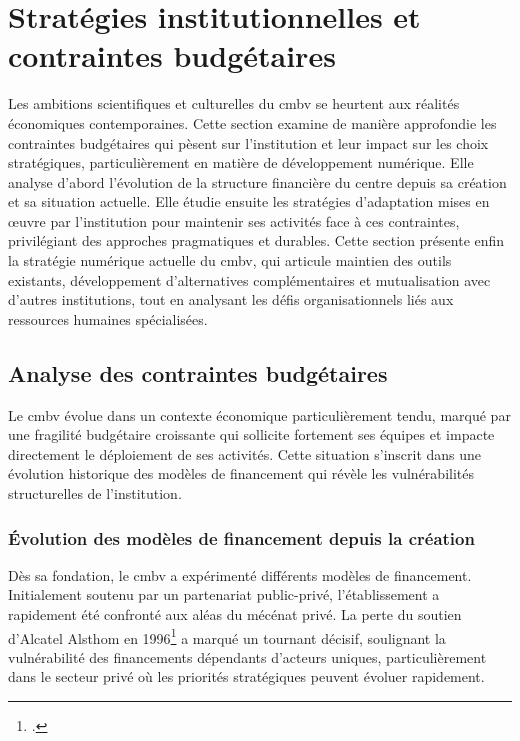 \section{Stratégies institutionnelles et contraintes budgétaires}

Les ambitions scientifiques et culturelles du \gls{cmbv} se heurtent aux réalités économiques contemporaines. Cette section examine de manière approfondie les contraintes budgétaires qui pèsent sur l'institution et leur impact sur les choix stratégiques, particulièrement en matière de développement numérique. Elle analyse d'abord l'évolution de la structure financière du centre depuis sa création et sa situation actuelle. Elle étudie ensuite les stratégies d'adaptation mises en œuvre par l'institution pour maintenir ses activités face à ces contraintes, privilégiant des approches pragmatiques et durables. Cette section présente enfin la stratégie numérique actuelle du \gls{cmbv}, qui articule maintien des outils existants, développement d'alternatives complémentaires et mutualisation avec d'autres institutions, tout en analysant les défis organisationnels liés aux ressources humaines spécialisées.

\subsection{Analyse des contraintes budgétaires}

Le \gls{cmbv} évolue dans un contexte économique particulièrement tendu, marqué par une fragilité budgétaire croissante qui sollicite fortement ses équipes et impacte directement le déploiement de ses activités. Cette situation s'inscrit dans une évolution historique des modèles de financement qui révèle les vulnérabilités structurelles de l'institution.

\subsubsection{Évolution des modèles de financement depuis la création}

Dès sa fondation, le \gls{cmbv} a expérimenté différents modèles de financement. Initialement soutenu par un partenariat public-privé, l'établissement a rapidement été confronté aux aléas du mécénat privé. La perte du soutien d'Alcatel Alsthom en 1996\footcite{CentreMusiqueBaroque} a marqué un tournant décisif, soulignant la vulnérabilité des financements dépendants d'acteurs uniques, particulièrement dans le secteur privé où les priorités stratégiques peuvent évoluer rapidement.

